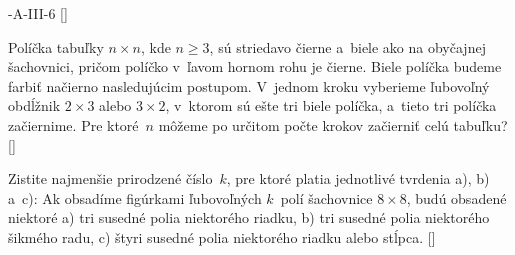 {%
-A-III-6
[]

Políčka tabuľky $n\times n$, kde $n\ge3$, sú
striedavo čierne a~biele ako na obyčajnej šachovnici,
pričom políčko v~ľavom hornom rohu je čierne.
Biele políčka budeme farbiť načierno nasledujúcim postupom.
V~jednom kroku vyberieme ľubovoľný obdĺžnik $2\times 3$ alebo $3\times
2$, v~ktorom sú ešte tri biele políčka, a~tieto tri políčka
začiernime. Pre ktoré~$n$ môžeme po určitom počte krokov
začierniť celú tabuľku?
[]

Zistite najmenšie prirodzené číslo~$k$, pre ktoré
platia jednotlivé tvrdenia a), b) a~c):
Ak obsadíme figúrkami ľubovoľných $k$~polí šachovnice $8\times8$,
budú obsadené niektoré
a) tri susedné polia niektorého riadku,
b) tri susedné polia niektorého šikmého radu,
c) štyri susedné polia niektorého riadku alebo stĺpca.
[]

}

